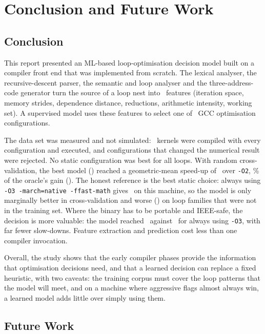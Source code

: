 \section{Conclusion and Future Work}

\subsection{Conclusion}

This report presented an ML-based loop-optimisation decision model built on a compiler
front end that was implemented from scratch. The lexical analyser, the recursive-descent parser,
the semantic and loop analyser and the three-address-code generator turn the source of a loop nest into
\numFeatures\ features (iteration space, memory strides, dependence distance, reductions,
arithmetic intensity, working set). A supervised model uses these features to select one of
\numConfigs\ GCC optimisation configurations.

The data set was measured and not simulated: \numKernels\ kernels were compiled with every configuration
and executed, and configurations that changed the numerical result were rejected. No static
configuration was best for all loops. With random cross-validation, the best model (\selModel) reached a
geometric-mean speed-up of \selGMCV\ over \texttt{-O2}, \selFracCV\% of the oracle's gain (\oracleGM). The honest reference is the
best static choice: always using \texttt{-O3 -march=native -ffast-math} gives \gmOFast\ on this machine, so the model
is only marginally better in cross-validation and worse (\selGMLOFO) on loop families that were not in the training set.
Where the binary has to be portable and IEEE-safe, the decision is more valuable: the model reached \pCV\ against \pOThree\ for
always using \texttt{-O3}, with far fewer slow-downs. Feature extraction and prediction cost less than one compiler invocation.

Overall, the study shows that the early compiler phases provide the information that optimisation decisions need,
and that a learned decision can replace a fixed heuristic, with two caveats: the training corpus must cover the
loop patterns that the model will meet, and on a machine where aggressive flags almost always win, a learned model adds
little over simply using them.

\subsection{Future Work}

